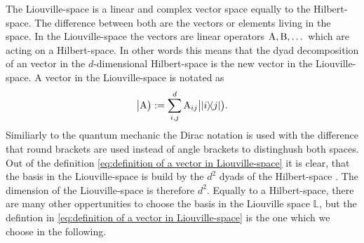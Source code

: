 The Liouville-space is a linear and complex vector space equally to the Hilbert-space.
The difference between both are the vectors or elements living in the space.
In the Liouville-space the vectors are linear operators $\mathrm{A}, \mathrm{B}, \dots$ which are acting on a Hilbert-space.
In other words this means that the dyad decomposition of an vector in the $d$-dimensional Hilbert-space is the new vector in the Liouville-space.
A vector in the Liouville-space is notated as
%
\begin{align}
	\oket{\mt{A}} := \sum\limits_{i,j}^{d} \mt{A}_{ij} \oket{\dyad{i}{j}}.
	\label{eq:definition of a vector in Liouville-space}
\end{align}
%
Similiarly to the quantum mechanic the Dirac notation is used with the difference that round brackets are used instead of angle brackets to distinghush both spaces.
Out of the definition \eqref{eq:definition of a vector in Liouville-space} it is clear, that the basis in the Liouville-space is build by the $d^{2}$ dyads of the Hilbert-space .
The dimension of the Liouville-space is therefore $d^{2}$.
Equally to a Hilbert-space, there are many other oppertunities to choose the basis in the Liouville space $\mathbb{L}$, but the defintion in \eqref{eq:definition of a vector in Liouville-space} is the one which we choose in the following.

